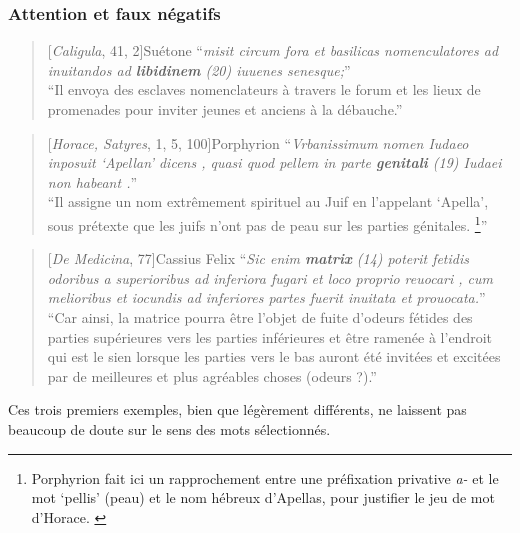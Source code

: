 \subsubsection{Attention et faux négatifs}

\begin{quote}[\textit{Caligula}, 41, 2]{Suétone}
    \enquote{\textit{misit circum fora et basilicas nomenculatores ad inuitandos ad \textbf{libidinem} (20) iuuenes senesque;}} \\
    \enquote{Il envoya des esclaves nomenclateurs à travers le forum et les lieux de promenades pour inviter jeunes et anciens à la débauche.}
\end{quote}

\begin{quote}[\textit{Horace, Satyres}, 1, 5, 100]{Porphyrion}
    \enquote{\textit{Vrbanissimum nomen Iudaeo inposuit ‘Apellan’ dicens , quasi quod pellem in parte \textbf{genitali} (19) Iudaei non habeant .}} \\
    \enquote{Il assigne un nom extrêmement spirituel au Juif en l'appelant ‘Apella’, sous prétexte que les juifs n'ont pas de peau sur les parties génitales. \footnote{Porphyrion fait ici un rapprochement entre une préfixation privative \textit{a-} et le mot \enquote{pellis} (peau) et le nom hébreux d'Apellas, pour justifier le jeu de mot d'Horace. \textcite{cordier2001romains}}}
\end{quote}

\begin{quote}[\textit{De Medicina}, 77]{Cassius Felix}
    \enquote{\textit{Sic enim \textbf{matrix} (14) poterit fetidis odoribus a superioribus ad inferiora fugari et loco proprio reuocari , cum melioribus et iocundis ad inferiores partes fuerit inuitata et prouocata.}} \\
    \enquote{Car ainsi, la matrice pourra être l'objet de fuite d'odeurs fétides des parties supérieures vers les parties inférieures et être ramenée à l'endroit qui est le sien lorsque les parties vers le bas auront été invitées et excitées par de meilleures et plus agréables choses (odeurs ?).}
\end{quote}

Ces trois premiers exemples, bien que légèrement différents, ne laissent pas beaucoup de doute sur le sens des mots sélectionnés. 

